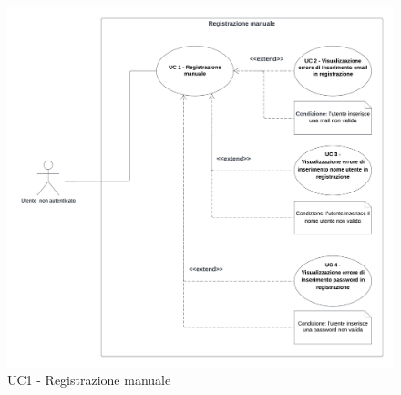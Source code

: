 \begin{figure}[!h]
    \includegraphics[width=15cm]{sezioni/Images/UC1.png}
    \centering
    \caption{UC1 - Registrazione manuale}
\end{figure}

